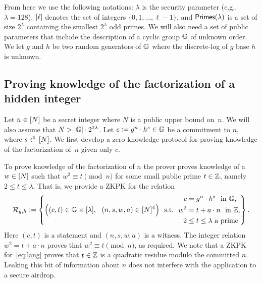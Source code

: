 \documentclass[11pt]{article}
\begin{document}
From here we use the following notations:
$\lambda$ is the security parameter (e.g., $\lambda = 128$), 
$[{\ell}]$ denotes the set of integers $\{0,1,\ldots,\ell-1\}$, and 
$\textsf{Primes}(\lambda)$ is a set of size $2^\lambda$ 
containing the smallest $2^\lambda$ odd primes. 
%
We will also need a set of public parameters that include the description
of a cyclic group $\mathbb G$ of unknown order.  We let $g$ and $h$ be two
random generators of $\mathbb G$ where the discrete-log of $g$ base $h$ is unknown. 


\subsection{Proving knowledge of the factorization of a hidden integer}\label{sec:rsa:proving}

Let $n \in [{N}]$ be a secret integer 
where $N$ is a public upper bound on~$n$.
We will also assume that $N > \lvert \mathbb G \rvert \cdot 2^{2 \lambda}$.
Let $c \mathrel{\mathop:}= g^n \cdot h^s \in \mathbb G$ be a commitment to $n$, 
where $s \rgets \range{N}$.  
We first develop a zero knowledge protocol for proving knowledge of the
factorization of~$n$ given only $c$. 


To prove knowledge of the factorization of $n$ the prover
proves knowledge of a $w \in [{N}]$ such that $w^2 \equiv t \pmod{n}$
for some small public prime $t \in \mathbb Z$, namely $2 \leq t \leq \lambda$.
That is, we provide a ZKPK for the relation
\begin{equation} \label{eq:lang}
  {\cal R}_{g,h} \deq \left\{ \Bigl( (c, t) \in \GG \times \range{\lambda},\ \ 
                              (n, s, w, a) \in \range{N}^4 \Bigr)  \ \ 
        \text{s.t.}\ \ 
                \begin{split}
                        c   & = g^n \cdot h^s \ \ \text{in $\GG$}, \\
                        w^2 & = t + a \cdot n \ \ \text{in $\ZZ$}, \\
                        2 & \leq t \leq \lambda  \ \textrm{a prime}
                \end{split}  \right\}.
\end{equation}
Here $(c, t)$ is a statement and $(n, s, w, a)$ is a witness.
The integer relation $w^2 = t + a\cdot n$ proves that 
$w^2 \equiv t \pmod{n}$, as required.
We note that a ZKPK for~\eqref{eq:lang} proves that $t \in \mathbb Z$ is a quadratic
residue modulo the committed $n$.  Leaking this bit of information about $n$
does not interfere with the application to a secure
\RSW{``secure'' $\rightarrow$ ``private''?}
airdrop.
\end{document}
